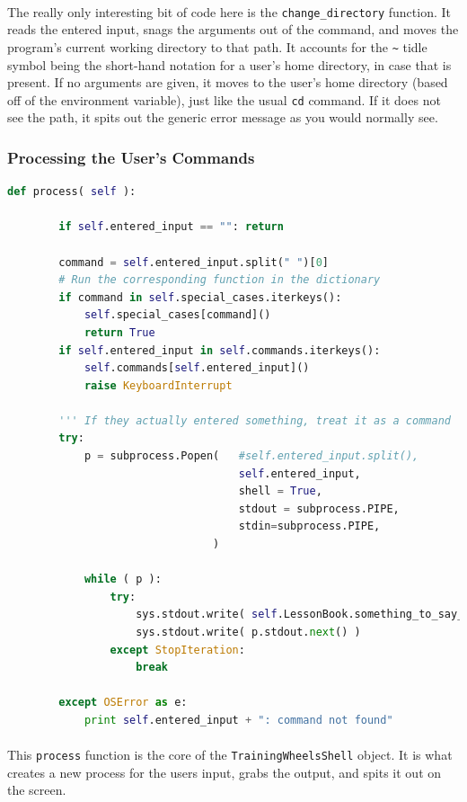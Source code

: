 \documentclass[11pt]{article}
\begin{document}
	\paragraph{} The really only interesting bit of code here is the \texttt{change\_directory} function. It reads the entered input, snags the arguments out of the command, and moves the program's current working directory to that path.  It accounts for the \texttt{\~} tidle symbol being the short-hand notation for a user's home directory, in case that is present. If no arguments are given, it moves to the user's home directory (based off of the environment variable), just like the usual \texttt{cd} command. If it does not see the path, it spits out the generic error message as you would normally see.

	\subsubsection{Processing the User's Commands}

\begin{lstlisting}[language=Python]
	def process( self ):

		if self.entered_input == "": return

		command = self.entered_input.split(" ")[0]
		# Run the corresponding function in the dictionary
		if command in self.special_cases.iterkeys():
			self.special_cases[command]()
			return True
		if self.entered_input in self.commands.iterkeys():
			self.commands[self.entered_input]()
			raise KeyboardInterrupt
		
		''' If they actually entered something, treat it as a command '''
		try:
			p = subprocess.Popen(	#self.entered_input.split(), 
									self.entered_input, 
									shell = True,
									stdout = subprocess.PIPE, 
									stdin=subprocess.PIPE,
								)

			while ( p ):
				try:
					sys.stdout.write( self.LessonBook.something_to_say_inbetween )
					sys.stdout.write( p.stdout.next() )
				except StopIteration:
					break

		except OSError as e:
			print self.entered_input + ": command not found"

\end{lstlisting}

	\paragraph{}

	\paragraph{} This \texttt{process} function is the core of the \texttt{TrainingWheelsShell} object. It is what creates a new process for the users input, grabs the output, and spits it out on the screen.
\end{document}
